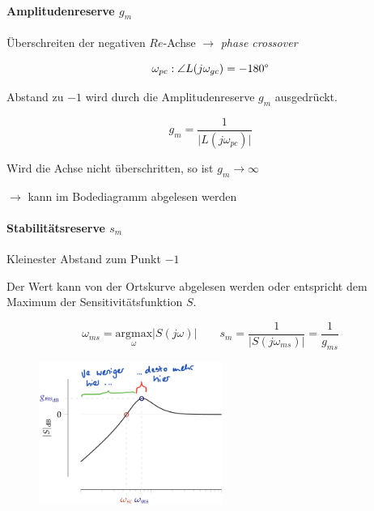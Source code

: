 \documentclass[
  10pt,
  a4paper,
  twocolumn]{article}
\let\oldparagraph\paragraph
\renewcommand{\paragraph}[1]{\oldparagraph{#1}\mbox{}}
\numberwithin{equation}{section}
\let\paragraph\oldparagraph
\renewcommand{\paragraph}[1]{\oldparagraph{#1}\mbox{}\par}
\begin{document}
\hypertarget{amplitudenreserve-g_m}{%
\paragraph{\texorpdfstring{Amplitudenreserve
\(g_m\)}{Amplitudenreserve g\_m}}\label{amplitudenreserve-g_m}}

Überschreiten der negativen \(Re\)-Achse \(\rightarrow\) \emph{phase
crossover}

\[
\omega_{pc} : \angle L(j\omega_{gc})= -180\degree
\]

Abstand zu \(-1\) wird durch die Amplitudenreserve \(g_m\) ausgedrückt.

\[
g_m = \frac1{\lvert L(j\omega_{pc})\rvert}
\]

Wird die Achse nicht überschritten, so ist \(g_m\rightarrow\infty\)

\(\rightarrow\) kann im Bodediagramm abgelesen werden

\hypertarget{stabilituxe4tsreserve-s_m}{%
\paragraph{\texorpdfstring{Stabilitätsreserve
\(s_m\)}{Stabilitätsreserve s\_m}}\label{stabilituxe4tsreserve-s_m}}

Kleinester Abstand zum Punkt \(-1\)

Der Wert kann von der Ortskurve abgelesen werden oder entspricht dem
Maximum der Sensitivitätsfunktion \(S\).

\[
\omega_{ms} = \underset{\omega}{\text{argmax}}\lvert S(j\omega)\rvert\qquad s_m = \frac1{\lvert S(j\omega_{ms})\rvert}=\frac1{g_{ms}}
\]

\begin{figure}[H]

{\centering \includegraphics[width=6cm,height=\textheight]{images/paste-33.png}

}

\end{figure}
\end{document}
